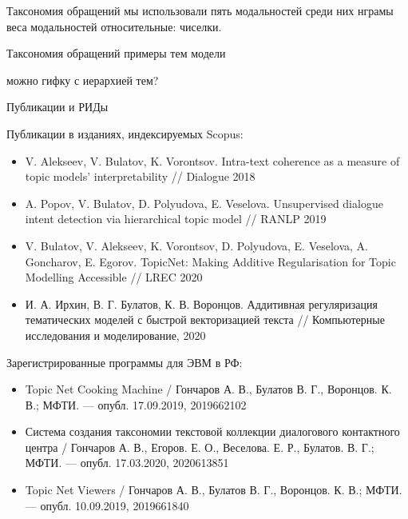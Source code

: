 \begin{frame}{Таксономия обращений}
    мы использовали пять модальностей
    среди них нграмы
	веса модальностей относительные: чиселки.
\end{frame}

\begin{frame}{Таксономия обращений}
	примеры тем модели

	можно гифку с иерархией тем?
\end{frame}

\begin{frame}[t]{Публикации и РИДы}
\footnotesize

Публикации в изданиях, индексируемых Scopus:
\begin{itemize}
    \smallskip\item  V. Alekseev, V. Bulatov, K. Vorontsov. Intra-text coherence as a measure of topic models’ interpretability  // Dialogue 2018

    \smallskip\item A. Popov, V. Bulatov, D. Polyudova, E. Veselova. Unsupervised dialogue intent detection via hierarchical topic model // RANLP 2019

    \smallskip\item V. Bulatov, V. Alekseev, K. Vorontsov, D. Polyudova, E. Veselova, A. Goncharov, E. Egorov. TopicNet: Making Additive Regularisation for Topic Modelling Accessible // LREC 2020

    \smallskip\item\color{red} И. А. Ирхин, В. Г. Булатов, К. В. Воронцов. Аддитивная регуляризация тематических моделей с быстрой векторизацией текста // Компьютерные исследования и моделирование, 2020
\end{itemize}

Зарегистрированные программы для ЭВМ в РФ:
\begin{itemize}
    \smallskip\item  Topic Net Cooking Machine  / Гончаров А. В., Булатов В. Г., Воронцов. К. В.; МФТИ. --- опубл. 17.09.2019, 2019662102

    \smallskip\item Система создания таксономии текстовой коллекции диалогового контактного центра / Гончаров А. В., Егоров. Е. О., Веселова. Е. Р., Булатов. В. Г.; МФТИ. --- опубл. 17.03.2020, 2020613851

    \smallskip\item Topic Net Viewers  / Гончаров А. В., Булатов В. Г., Воронцов. К. В.; МФТИ. --- опубл. 10.09.2019, 2019661840

\end{itemize}

\normalsize
\end{frame}


